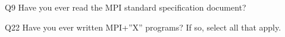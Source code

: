 \begin{description}%
\item{Q9} Have you ever read the MPI standard specification document?%
\item{Q22} Have you ever written MPI+”X” programs? If so, select all that apply.%
\end{description}%
